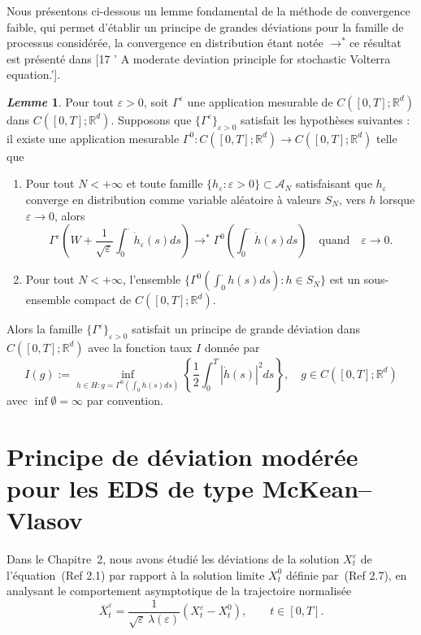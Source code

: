 \documentclass[12pt,a4paper,twoside]{report}%
\theoremstyle{definition}
\newtheorem{lem}[dfn]{\textit{Lemme}}
\numberwithin{equation}{section}
\begin{document}
Nous présentons ci-dessous un lemme fondamental de la méthode de convergence faible, qui permet d’établir un principe de grandes déviations pour la famille de processus considérée, la convergence en distribution étant notée \( \to^* \)ce résultat est présenté dans [17 ' A moderate deviation principle for stochastic Volterra equation.'].
	 
	\begin{lem}\label{lem:3.1.2}
			Pour tout \( \varepsilon > 0 \), soit \( \Gamma^\varepsilon \) une application mesurable de \( C([0, T]; \mathbb{R}^d) \) dans \( C([0, T]; \mathbb{R}^d) \). Supposons que \( \{\Gamma^\varepsilon\}_{\varepsilon > 0} \) satisfait les hypothèses suivantes : il existe une application mesurable \( \Gamma^0 : C([0, T]; \mathbb{R}^d) \to C([0, T]; \mathbb{R}^d) \) telle que
		\begin{enumerate}
			\item[(a)] Pour tout \( N < +\infty \) et toute famille \( \{h_\varepsilon : \varepsilon > 0\} \subset \mathscr{A}_N \) satisfaisant que \( h_\varepsilon \) converge en distribution comme variable aléatoire à valeurs \( S_N \), vers \( h \) lorsque \( \varepsilon \to 0 \), alors
			\[
			\Gamma^\varepsilon \left( W + \frac{1}{\sqrt{\varepsilon}} \int_0^\cdot \dot{h}_\varepsilon(s) ds \right) \to^* \Gamma^0 \left( \int_0^\cdot \dot{h}(s) ds \right) \quad \text{quand} \quad \varepsilon \to 0.
			\]
			\item[(b)] Pour tout \( N < +\infty \), l'ensemble \( \{\Gamma^0(\int_0^\cdot h(s) ds) : h \in S_N\} \) est un sous-ensemble compact de \( C([0, T]; \mathbb{R}^d) \).
		\end{enumerate}
		
		Alors la famille \( \{\Gamma^\varepsilon\}_{\varepsilon > 0} \) satisfait un principe de grande déviation dans \( C([0, T]; \mathbb{R}^d) \) avec la fonction taux \( I \) donnée par
		\[
		I(g) := \inf_{h \in H : g = \Gamma^0(\int_0^\cdot \dot{h}(s) ds)} \left\{ \frac{1}{2} \int_0^T |\dot{h}(s)|^2 ds \right\}, \quad g \in C([0, T]; \mathbb{R}^d)
		\]
		avec \( \inf \emptyset = \infty \) par convention.
	\end{lem} 
\section{Principe de déviation modérée pour les EDS de type McKean--Vlasov}

Dans le Chapitre~2, nous avons étudié les déviations de la solution $X_t^\varepsilon$ de l’équation~(Ref 2.1) par rapport à la solution limite $X_t^0$ définie par~(Ref 2.7), en analysant le comportement asymptotique de la trajectoire normalisée
\begin{equation}\label{eq:3.2.1}
\overline{X}_t^\varepsilon
= \frac{1}{\sqrt{\varepsilon}\,\lambda(\varepsilon)}
\left(X_t^\varepsilon - X_t^0\right),
\qquad t \in [0,T].
\end{equation}
\end{document}
